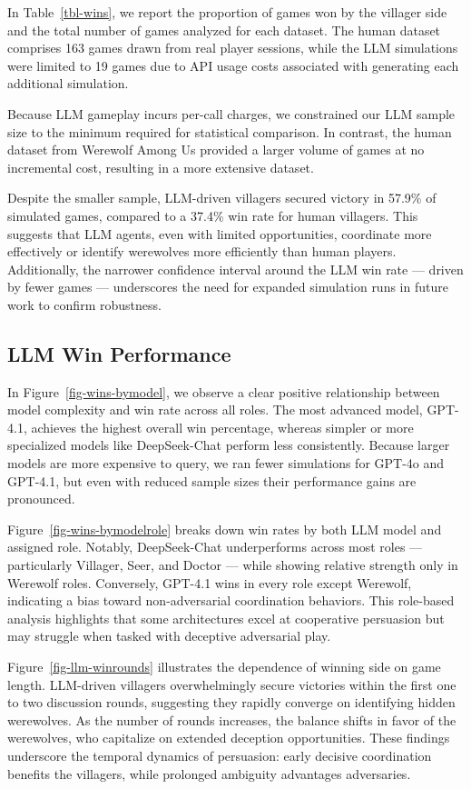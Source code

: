 \documentclass[
  letterpaper,
  DIV=11,
  numbers=noendperiod,
  oneside]{scrreprt}
\begin{document}
In Table~\ref{tbl-wins}, we report the proportion of games won by the
villager side and the total number of games analyzed for each dataset.
The human dataset comprises 163 games drawn from real player sessions,
while the LLM simulations were limited to 19 games due to API usage
costs associated with generating each additional simulation.

Because LLM gameplay incurs per-call charges, we constrained our LLM
sample size to the minimum required for statistical comparison. In
contrast, the human dataset from Werewolf Among Us provided a larger
volume of games at no incremental cost, resulting in a more extensive
dataset.

Despite the smaller sample, LLM-driven villagers secured victory in
57.9\% of simulated games, compared to a 37.4\% win rate for human
villagers. This suggests that LLM agents, even with limited
opportunities, coordinate more effectively or identify werewolves more
efficiently than human players. Additionally, the narrower confidence
interval around the LLM win rate --- driven by fewer games ---
underscores the need for expanded simulation runs in future work to
confirm robustness.

\subsection{LLM Win Performance}\label{llm-win-performance}

In Figure~\ref{fig-wins-bymodel}, we observe a clear positive
relationship between model complexity and win rate across all roles. The
most advanced model, GPT-4.1, achieves the highest overall win
percentage, whereas simpler or more specialized models like
DeepSeek-Chat perform less consistently. Because larger models are more
expensive to query, we ran fewer simulations for GPT-4o and GPT-4.1, but
even with reduced sample sizes their performance gains are pronounced.

Figure~\ref{fig-wins-bymodelrole} breaks down win rates by both LLM
model and assigned role. Notably, DeepSeek-Chat underperforms across
most roles --- particularly Villager, Seer, and Doctor --- while showing
relative strength only in Werewolf roles. Conversely, GPT-4.1 wins in
every role except Werewolf, indicating a bias toward non-adversarial
coordination behaviors. This role-based analysis highlights that some
architectures excel at cooperative persuasion but may struggle when
tasked with deceptive adversarial play.

Figure~\ref{fig-llm-winrounds} illustrates the dependence of winning
side on game length. LLM-driven villagers overwhelmingly secure
victories within the first one to two discussion rounds, suggesting they
rapidly converge on identifying hidden werewolves. As the number of
rounds increases, the balance shifts in favor of the werewolves, who
capitalize on extended deception opportunities. These findings
underscore the temporal dynamics of persuasion: early decisive
coordination benefits the villagers, while prolonged ambiguity
advantages adversaries.
\end{document}
